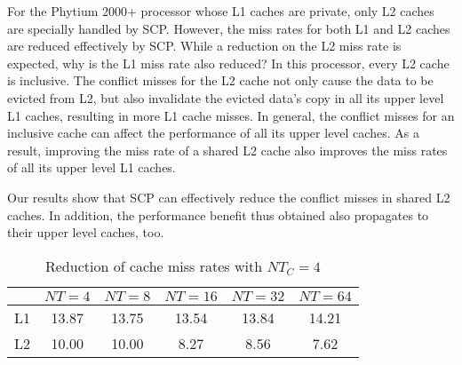 For the Phytium 2000+ processor whose L1 caches are private,
only L2 caches are specially handled by SCP.
However,
the miss rates for both L1 and L2 caches
are reduced effectively by SCP.
While a reduction on the L2 miss rate is expected,
why is the L1 miss rate also reduced? In this processor,
every L2 cache is inclusive.
The conflict misses for the L2 cache not only cause
the data to be evicted from L2,
but also invalidate the evicted data's copy in all its
upper level L1 caches,
resulting in more L1 cache misses.
In general, the conflict misses for
an inclusive cache can affect
the performance of all its upper level caches.
As a result, improving the miss rate of a shared L2 cache
also improves the miss rates of all its upper level L1 caches.

Our results show that SCP can effectively
reduce the conflict misses in shared L2 caches.
In addition, the performance benefit thus obtained
also propagates to their upper level caches, too.

\begin{table}
  \centering
  \caption{Reduction of cache miss rates with $NT_C=4$}
  \label{tab:papi}
  \setlength{\tabcolsep}{3.5pt}
  \begin{tabular}{lccccc}
    \toprule
     & $NT=4$ & $NT=8$ & $NT=16$ & $NT=32$ & $NT=64$ \\
    \midrule
    L1     & 13.87 & 13.75 & 13.54 & 13.84 & 14.21 \\
    L2     & 10.00 & 10.00 & 8.27 & 8.56 & 7.62 \\
    \bottomrule
  \end{tabular}
\end{table}

